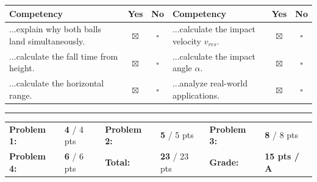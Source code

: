 \documentclass[10pt, a4paper]{article}
\newcommand{\lsg}[1]{\textcolor{loesung}{\textbf{#1}}}
\begin{document}
\begin{tabular}{|p{6cm}|c|c||p{6cm}|c|c|}
\hline
\textbf{Competency} & \textbf{Yes} & \textbf{No} & \textbf{Competency} & \textbf{Yes} & \textbf{No} \\
\hline
...explain why both balls land simultaneously. & \lsg{$\boxtimes$} & $\square$ &
...calculate the impact velocity $v_{res}$. & \lsg{$\boxtimes$} & $\square$ \\
\hline
...calculate the fall time from height. & \lsg{$\boxtimes$} & $\square$ &
...calculate the impact angle $\alpha$. & \lsg{$\boxtimes$} & $\square$ \\
\hline
...calculate the horizontal range. & \lsg{$\boxtimes$} & $\square$ &
...analyze real-world applications. & \lsg{$\boxtimes$} & $\square$ \\
\hline
\end{tabular}


\vfill
\hrule
\vspace{4pt}
\small
\begin{tabular}{llllll}
\textbf{Problem 1:} & \lsg{4} / 4 pts &
\textbf{Problem 2:} & \lsg{5} / 5 pts &
\textbf{Problem 3:} & \lsg{8} / 8 pts \\[4pt]
\textbf{Problem 4:} & \lsg{6} / 6 pts &
\textbf{Total:} & \lsg{23} / 23 pts &
\textbf{Grade:} & \lsg{15 pts / A}
\end{tabular}
\end{document}
